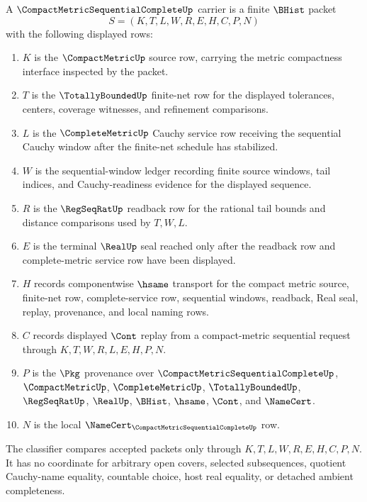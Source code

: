 \begin{definition}
\label{def:compact-metric-sequential-complete-carrier}
A $\CompactMetricSequentialCompleteUp$ carrier is a finite $\BHist$ packet
$$
S=(K,T,L,W,R,E,H,C,P,N)
$$
with the following displayed rows:
\begin{enumerate}
\item $K$ is the $\CompactMetricUp$ source row, carrying the metric compactness interface inspected by the packet.
\item $T$ is the $\TotallyBoundedUp$ finite-net row for the displayed tolerances, centers, coverage witnesses, and refinement comparisons.
\item $L$ is the $\CompleteMetricUp$ Cauchy service row receiving the sequential Cauchy window after the finite-net schedule has stabilized.
\item $W$ is the sequential-window ledger recording finite source windows, tail indices, and Cauchy-readiness evidence for the displayed sequence.
\item $R$ is the $\RegSeqRatUp$ readback row for the rational tail bounds and distance comparisons used by $T,W,L$.
\item $E$ is the terminal $\RealUp$ seal reached only after the readback row and complete-metric service row have been displayed.
\item $H$ records componentwise $\hsame$ transport for the compact metric source, finite-net row, complete-service row, sequential windows, readback, Real seal, replay, provenance, and local naming rows.
\item $C$ records displayed $\Cont$ replay from a compact-metric sequential request through $K,T,W,R,L,E,H,P,N$.
\item $P$ is the $\Pkg$ provenance over $\CompactMetricSequentialCompleteUp$, $\CompactMetricUp$, $\CompleteMetricUp$, $\TotallyBoundedUp$, $\RegSeqRatUp$, $\RealUp$, $\BHist$, $\hsame$, $\Cont$, and $\NameCert$.
\item $N$ is the local $\NameCert_{\CompactMetricSequentialCompleteUp}$ row.
\end{enumerate}
The classifier compares accepted packets only through $K,T,L,W,R,E,H,C,P,N$. It has no coordinate for arbitrary open covers, selected subsequences, quotient Cauchy-name equality, countable choice, host real equality, or detached ambient completeness.
\end{definition}

